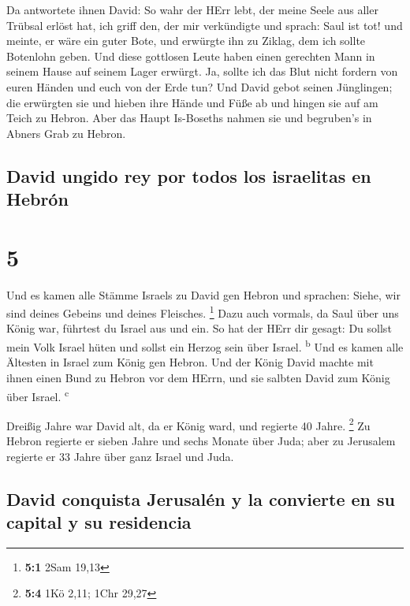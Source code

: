  Da antwortete ihnen David: So wahr der HErr lebt, der
meine Seele aus aller Trübsal erlöst hat,  ich griff den,
der mir verkündigte und sprach: Saul ist tot! und meinte, er wäre ein
guter Bote, und erwürgte ihn zu Ziklag, dem ich sollte Botenlohn geben.
 Und diese gottlosen Leute haben einen gerechten Mann in
seinem Hause auf seinem Lager erwürgt. Ja, sollte ich das Blut nicht
fordern von euren Händen und euch von der Erde tun?  Und
David gebot seinen Jünglingen; die erwürgten sie und hieben ihre Hände
und Füße ab und hingen sie auf am Teich zu Hebron. Aber das Haupt
Is-Boseths nahmen sie und begruben's in Abners Grab zu Hebron.

\hypertarget{david-ungido-rey-por-todos-los-israelitas-en-hebruxf3n}{%
\subsection{David ungido rey por todos los israelitas en
Hebrón}\label{david-ungido-rey-por-todos-los-israelitas-en-hebruxf3n}}

\hypertarget{section-4}{%
\section{5}\label{section-4}}

 Und es kamen alle Stämme Israels zu David gen Hebron und
sprachen: Siehe, wir sind deines Gebeins und deines Fleisches.
\footnote{\textbf{5:1} 2Sam 19,13}  Dazu auch vormals, da
Saul über uns König war, führtest du Israel aus und ein. So hat der HErr
dir gesagt: Du sollst mein Volk Israel hüten und sollst ein Herzog sein
über Israel. \textsuperscript{b}  Und es kamen alle
Ältesten in Israel zum König gen Hebron. Und der König David machte mit
ihnen einen Bund zu Hebron vor dem HErrn, und sie salbten David zum
König über Israel. \textsuperscript{c}

 Dreißig Jahre war David alt, da er König ward, und
regierte 40 Jahre. \footnote{\textbf{5:4} 1Kö 2,11; 1Chr 29,27}
 Zu Hebron regierte er sieben Jahre und sechs Monate über
Juda; aber zu Jerusalem regierte er 33 Jahre über ganz Israel und Juda.

\hypertarget{david-conquista-jerusaluxe9n-y-la-convierte-en-su-capital-y-su-residencia}{%
\subsection{David conquista Jerusalén y la convierte en su capital y su
residencia}\label{david-conquista-jerusaluxe9n-y-la-convierte-en-su-capital-y-su-residencia}}

